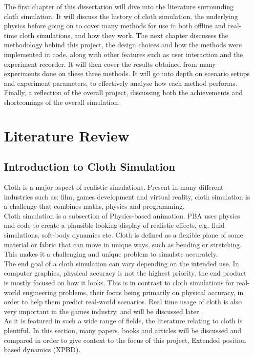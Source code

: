 \documentclass[12pt,a4paper]{article}
\begin{document}
The first chapter of this dissertation will dive into the literature surrounding cloth simulation. It will discuss the history of cloth simulation, the underlying physics before going on to cover many methods for use in both offline and real-time cloth simulations, and how they work. The next chapter discusses the methodology behind this project, the design choices and how the methods were implemented in code, along with other features such as user interaction and the experiment recorder. It will then cover the results obtained from many experiments done on these three methods. It will go into depth on scenario setups and experiment parameters, to effectively analyse how each method performs. Finally, a reflection of the overall project, discussing both the achievements and shortcomings of the overall simulation.
\newpage
\section{Literature Review}
\subsection{Introduction to Cloth Simulation}
Cloth is a major aspect of realistic simulations. Present in many different industries such as: film, games development and virtual reality, cloth simulation is a challenge that combines maths, physics and programming. \\

Cloth simulation is a subsection of Physics-based animation. PBA uses physics and code to create a plausible looking display of realistic effects, e.g. fluid simulations, soft-body dynamics etc. Cloth is defined as a flexible plane of some material or fabric that can move in unique ways, such as bending or stretching. This makes it a challenging and unique problem to simulate accurately. \\

The end goal of a cloth simulation can vary depending on the intended use. In computer graphics, physical accuracy is not the highest priority, the end product is mostly focused on how it looks. This is in contrast to cloth simulations for real-world engineering problems, their focus being primarily on physical accuracy, in order to help them predict real-world scenarios. Real time usage of cloth is also very important in the games industry, and will be discussed later. \\

As it is featured in such a wide range of fields, the literature relating to cloth is plentiful. In this section, many papers, books and articles will be discussed and compared in order to give context to the focus of this project, Extended position based dynamics (XPBD).
\end{document}
